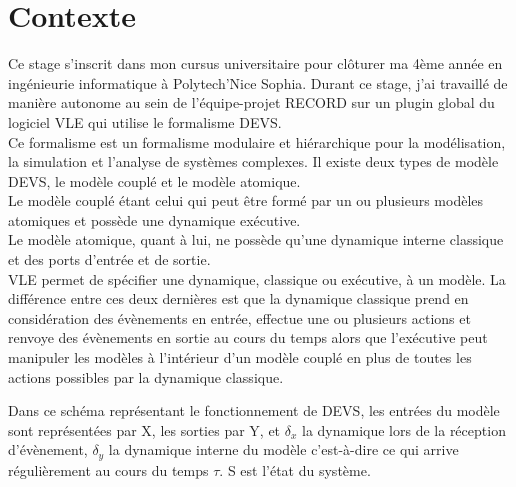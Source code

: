 \section{Contexte}
Ce stage s'inscrit dans mon cursus universitaire pour clôturer ma 4ème année en ingénieurie informatique à Polytech'Nice Sophia.
Durant ce stage, j'ai travaillé de manière autonome au sein de l'équipe-projet RECORD sur un plugin global du logiciel VLE qui utilise le formalisme DEVS.\\
Ce formalisme est un formalisme modulaire et hiérarchique pour la modélisation, la simulation et l'analyse de systèmes complexes. Il existe deux types de modèle DEVS, le modèle couplé et le modèle atomique. \\
Le modèle couplé étant celui qui peut être formé par un ou plusieurs modèles atomiques et possède une dynamique exécutive.\\
Le modèle atomique, quant à lui, ne possède qu'une dynamique interne classique et des ports d'entrée et de sortie.\\
VLE permet de spécifier une dynamique, classique ou exécutive, à un modèle. La différence entre ces deux dernières est que la dynamique classique prend en considération des évènements en entrée, effectue une ou plusieurs actions et renvoye des évènements en sortie au cours du temps alors que l'exécutive peut manipuler les modèles à l'intérieur d'un modèle couplé en plus de toutes les actions possibles par la dynamique classique.\\

\begin{minipage}{\linewidth}%
\end{minipage}

Dans ce schéma représentant le fonctionnement de DEVS, les entrées du modèle sont représentées par X, les sorties par Y, et $\delta_{x}$ la dynamique lors de la réception d'évènement, $\delta_{y}$ la dynamique interne du modèle c'est-à-dire ce qui arrive régulièrement au cours du temps $\tau$. S est l'état du système.
